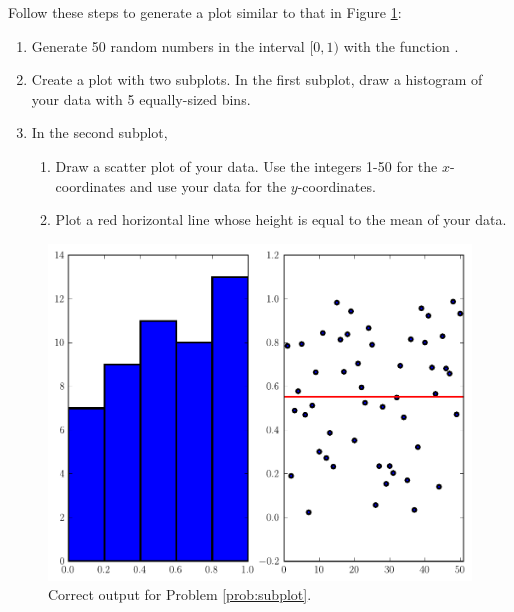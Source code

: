 \begin{problem}\label{prob:subplot}
Follow these steps to generate a plot similar to that in Figure \ref{fig:subplotProb}:
\begin{enumerate}
\item Generate 50 random numbers in the interval $[0,1)$ with the function .
\item Create a plot with two subplots. 
In the first subplot, draw a histogram of your data with 5 equally-sized bins.
\item In the second subplot, 
\begin{enumerate}
\item Draw a scatter plot of your data. 
Use the integers 1-50 for the $x$-coordinates and use your data for the $y$-coordinates.
\item Plot a red horizontal line whose height is equal to the mean of your data.
\end{enumerate}
\end{enumerate}

\begin{figure}[H]
\includegraphics[width=.7\textwidth]{subplotProb.pdf}
\caption{Correct output for Problem \ref{prob:subplot}.}
\label{fig:subplotProb}
\end{figure}

\end{problem}

